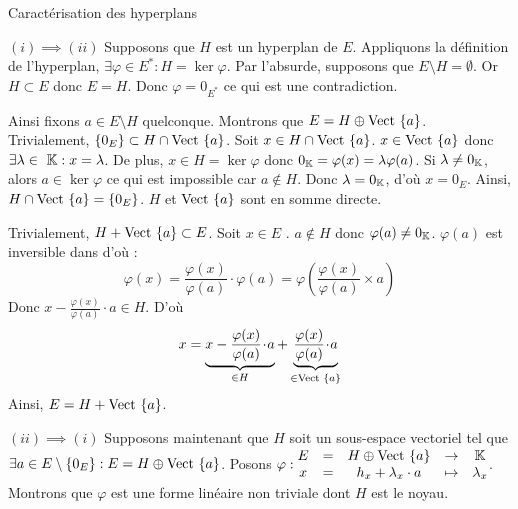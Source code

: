 \documentclass{article}
\begin{document}
	\begin{question_kholle}
		[Soit $H$ un \sev de $E$.
		Les conditions suivantes sont équivalentes :
		\begin{propositions}
			\item $H$ est un hyperplan de $E$ :
			$\exists \varphi \in E^* : H = \ker \varphi$
			\item $H$ admet une droite vectorielle comme supplémentaire :
			$\exists a \in E \setminus \{0_E\} : H \oplus \Vect{\{a\}} = E$
		\end{propositions}]
		{Caractérisation des hyperplans}
		
		$(i) \implies (ii)$ Supposons que $H$ est un hyperplan de $E$.
		Appliquons la définition de l'hyperplan, $\exists \varphi \in E^* : H = \ker \varphi$.
		Par l'absurde, supposons que $E \setminus H = \emptyset$. Or $H \subset E$ donc $E = H$. Donc $\varphi = 0_{E^*}$ ce qui est une contradiction.

		Ainsi fixons $a \in E \setminus H$ quelconque.
		Montrons que $E = H \oplus \text{Vect }{\{a\}}$.
		Trivialement, $\{0_E\} \subset H \cap \text{Vect }{\{a\}}$.
		Soit $x \in H \cap \text{Vect }{\{a\}}$.
		$x \in \text{Vect }{\{a\}}$ donc $\exists \lambda \in  \K : x = \lambda$. De plus, $x \in H = \ker \varphi$ donc $0_{\mathbb K} = \varphi(x) = \lambda \varphi(a)$.
		Si $\lambda \neq 0_{\mathbb K}$, alors $a \in \ker \varphi$ ce qui est impossible car $a \notin H$.
		Donc $\lambda = 0_{\mathbb K}$, d'où $x = 0_E$.
		Ainsi, $H \cap \text{Vect }{\{a\}} = \{0_E\}$. $H$ et $\text{Vect }{\{a\}}$ sont en somme directe.
		
		Trivialement, $H + \text{Vect }{\{a\}} \subset E$.
		Soit $x \in E$ \fq.
		$a \notin H$ donc $\varphi(a) \neq 0_{\mathbb K}$. $\varphi(a)$ est inversible dans \K d'où :
		\begin{equation*}
			\varphi(x)
			= \frac{\varphi(x)}{\varphi(a)} \cdot \varphi(a)
			= \varphi\left( \frac{\varphi(x)}{\varphi(a)} \times a \right)
		\end{equation*}
		Donc $x - \frac{\varphi(x)}{\varphi(a)} \!\cdot\! a \in H$. D'où
		\begin{equation*}
			x =
			\underbrace{x - \frac{\varphi(x)}{\varphi(a)} \!\cdot\! a}_{\in H}
			+ \underbrace{\frac{\varphi(x)}{\varphi(a)} \!\cdot\! a}_{\in \text{Vect }{\{a\}}}
		\end{equation*}
		Ainsi, $E = H + \text{Vect }{\{a\}}$.
		
		$(ii) \implies (i)$ Supposons maintenant que $H$ soit un sous-espace vectoriel tel que $\exists a \in E \setminus \{0_E\} : E = H \oplus \text{Vect }{\{a\}}$.
		Posons $\displaystyle \varphi : \begin{matrix}
			E &=& H \oplus \text{Vect }{\{a\}} &\rightarrow& \mathbb K \\
			x &=& h_x + \lambda_x \cdot a &\mapsto& \lambda_x
		\end{matrix}$.
		Montrons que $\varphi$ est une forme linéaire non triviale dont $H$ est le noyau.
		\
		

\end{question_kholle}
\end{document}
